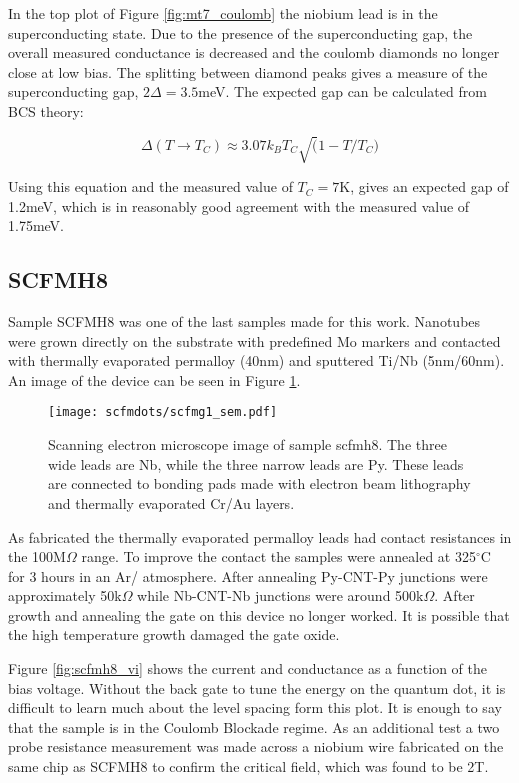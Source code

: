 In the top plot of Figure \ref{fig:mt7_coulomb} the niobium lead is in the superconducting state. Due to the presence of the superconducting gap, the overall measured conductance is decreased and the coulomb diamonds no longer close at low bias. The splitting between diamond peaks gives a measure of the superconducting gap, $2\Delta = 3.5$meV. The expected gap can be calculated from BCS theory:

\begin{equation}
    \label{eq:bcs_gap}
    \Delta (T \rightarrow T_C) \approx 3.07 k_B T_C \sqrt(1 - T/T_C)
\end{equation}

Using this equation and the measured value of $T_C = 7$K, gives an expected gap of 1.2meV, which is in reasonably good agreement with the measured value of 1.75meV.

\subsection*{SCFMH8}

Sample SCFMH8 was one of the last samples made for this work. Nanotubes were grown directly on the substrate with predefined Mo markers and contacted with thermally evaporated permalloy (40nm) and sputtered Ti/Nb (5nm/60nm). An image of the device can be seen in Figure \ref{fig:scfmh8}.

\begin{figure}
    \centering
    \texttt{[image: scfmdots/scfmg1\_sem.pdf]}
    \caption{Scanning electron microscope image of sample scfmh8. The three wide leads are Nb, while the three narrow leads are Py. These leads are connected to bonding pads made with electron beam lithography and thermally evaporated Cr/Au layers.}
    \label{fig:scfmh8}
\end{figure}

As fabricated the thermally evaporated permalloy leads had contact resistances in the 100M$\Omega$ range. To improve the contact the samples were annealed at 325$^\circ$C for 3 hours in an Ar/ atmosphere. After annealing Py-CNT-Py junctions were approximately 50k$\Omega$ while Nb-CNT-Nb junctions were around 500k$\Omega$. After growth and annealing the gate on this device no longer worked. It is possible that the high temperature growth damaged the gate oxide.

Figure \ref{fig:scfmh8_vi} shows the current and conductance as a function of the bias voltage. Without the back gate to tune the energy on the quantum dot, it is difficult to learn much about the level spacing form this plot. It is enough to say that the sample is in the Coulomb Blockade regime. As an additional test a two probe resistance measurement was made across a niobium wire fabricated on the same chip as SCFMH8 to confirm the critical field, which was found to be 2T.

